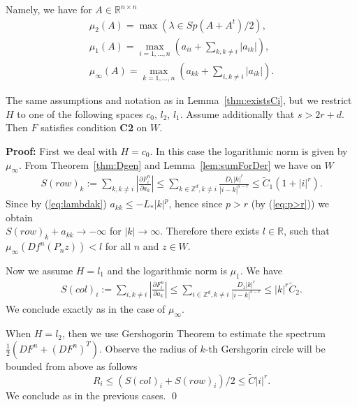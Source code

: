 Namely, we have for $A \in \mathbb{R}^{n \times n}$
\begin{eqnarray*}
  \mu_2 (A) = \max (\lambda \in Sp(A+A^t)/2), \\
  \mu_1 (A) = \max_{i=1,\dots,n} \left(a_{ii} + \sum_{k,k \neq i} |a_{ik}| \right), \\
  \mu_\infty(A) = \max_{k=1,\dots,n} \left(a_{kk} + \sum_{i,k \neq i} |a_{ik}| \right).
\end{eqnarray*}
\begin{lemma}
The same assumptions and notation as in Lemma~\ref{thm:existsCi}, but we restrict $H$ to one of the following spaces $c_0$, $l_2$, $l_1$. Assume additionally that $s>2r+d$. Then $F$ satisfies
condition {\bf C2} on $W$.
\end{lemma}
\textbf{Proof:}
First we deal with $H=c_0$. In this case the logarithmic norm is given by $\mu_\infty$.
From Theorem~\ref{thm:Dgen} and Lemma~\ref{lem:sumForDer} we have on $W$
\begin{eqnarray*}
S(row)_k:=\sum_{k,k \neq i} \left|\frac{\partial F^n_{i}}{\partial a_k} \right| \leq  \sum_{k \in \mathbb{Z}^d, k \neq i}\frac{D_1|k|^r}{|i-k|^{s-r}} \leq \tilde{C}_1(1 + |i|^r).
\end{eqnarray*}
Since  by (\ref{eq:lambdak}) $a_{kk}   \leq -L_* |k|^p$, hence since $p>r$ (by (\ref{eq:p>r})) we obtain \\
 $S(row)_k + a_{kk} \to -\infty$ for $|k| \to \infty$.
Therefore there exists $l \in \mathbb{R}$, such that
$\mu_{\infty}(Df^n(P_nz))< l$ for all $n$ and $z \in W$.

Now we assume  $H=l_1$ and the logarithmic norm is $\mu_1$. We have
\begin{eqnarray*}
S(col)_i:=\sum_{i,k \neq i} \left|\frac{\partial F^n_{i}}{\partial a_k} \right| \leq  \sum_{i \in \mathbb{Z}^d, k \neq i}\frac{D_1|k|^r}{|i-k|^{s-r}} \leq  |k|^r \tilde{C}_2.
\end{eqnarray*}
We conclude exactly as in the case of $\mu_\infty$.

When $H=l_2$, then we use Gershogorin Theorem \cite{G} to estimate the spectrum $\frac{1}{2}\left(DF^n + \left(DF^n\right)^T\right)$. Observe the radius of $k$-th Gershgorin circle
will be bounded from above as follows
\begin{equation*}
  R_i \leq (S(col)_i + S(row)_i)/2 \leq \tilde{C}|i|^r.
\end{equation*}
We conclude as in the previous cases.
\qed
